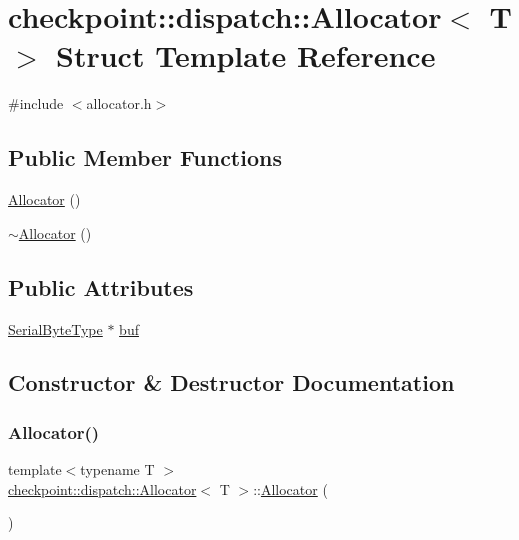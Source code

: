 \hypertarget{structcheckpoint_1_1dispatch_1_1_allocator}{}\section{checkpoint\+:\+:dispatch\+:\+:Allocator$<$ T $>$ Struct Template Reference}
\label{structcheckpoint_1_1dispatch_1_1_allocator}


{\ttfamily \#include $<$allocator.\+h$>$}

\subsection*{Public Member Functions}
\begin{DoxyCompactItemize}
\item 
\hyperlink{structcheckpoint_1_1dispatch_1_1_allocator_a40c8a12993552385721e85ca5b383d90}{Allocator} ()
\item 
\hyperlink{structcheckpoint_1_1dispatch_1_1_allocator_a7048344a23ba3b7bd0fa2ed0123586e5}{$\sim$\+Allocator} ()
\end{DoxyCompactItemize}
\subsection*{Public Attributes}
\begin{DoxyCompactItemize}
\item 
\hyperlink{namespacecheckpoint_ae57f01cdc0b81776c23b6c7c934c58f5}{Serial\+Byte\+Type} $\ast$ \hyperlink{structcheckpoint_1_1dispatch_1_1_allocator_a3d770c2b7a033aff92ba603be5b1027f}{buf}
\end{DoxyCompactItemize}


\subsection{Constructor \& Destructor Documentation}
\mbox{\label{structcheckpoint_1_1dispatch_1_1_allocator_a40c8a12993552385721e85ca5b383d90}} 
\subsubsection{\texorpdfstring{Allocator()}{Allocator()}}
{\footnotesize\ttfamily template$<$typename T $>$ \\
\hyperlink{structcheckpoint_1_1dispatch_1_1_allocator}{checkpoint\+::dispatch\+::\+Allocator}$<$ T $>$\+::\hyperlink{structcheckpoint_1_1dispatch_1_1_allocator}{Allocator} (\begin{DoxyParamCaption}{ }\end{DoxyParamCaption})\hspace{0.3cm}{\ttfamily [inline]}}

